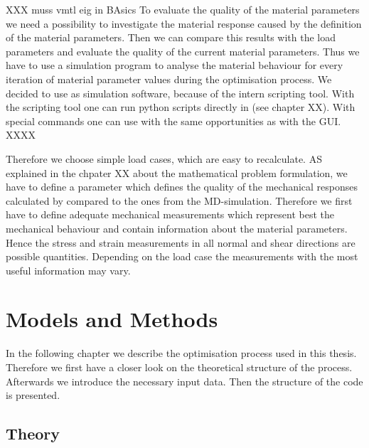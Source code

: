 
    XXX muss vmtl eig in BAsics
    To evaluate the quality of the material parameters we need a possibility to investigate the material response caused by the definition of the material parameters. Then we can compare this results with the load parameters and evaluate the quality of the current material parameters. Thus we have to use a simulation program to analyse the material behaviour for every iteration of material parameter values during the optimisation process. We decided to use  as simulation software, because of the intern scripting tool. With the  scripting tool one can run python scripts directly in  (see chapter XX). With special  commands one can use  with the same opportunities as with the GUI. 
    XXXX

    Therefore we choose simple load cases, which are easy to recalculate. AS explained in the chpater XX about the mathematical problem formulation, we have to define a parameter which defines the quality of the mechanical responses calculated by  compared to the ones from the MD-simulation. Therefore we first have to define adequate mechanical measurements which represent best the mechanical behaviour and contain information about the material parameters. Hence the stress and strain measurements in all normal and shear directions are possible quantities. Depending on the load case the measurements with the most useful information may vary.
    

    
    \chapter{Models and Methods} \label{chap: modelsAndMethods}

    In the following chapter we describe the optimisation process used in this thesis. Therefore we first have a closer look on the theoretical structure of the process. Afterwards we introduce the necessary input data. Then the structure of the code is presented. 

    \section{Theory} \label{sec: methodTheory}


